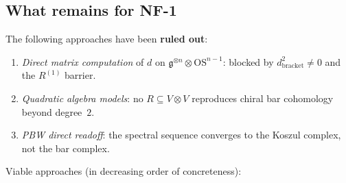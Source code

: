 \documentclass[11pt]{article}
\newcommand{\fg}{\mathfrak{g}}
\begin{document}
\subsection{What remains for NF-1}

The following approaches have been \textbf{ruled out}:

\begin{enumerate}[label=(\alph*)]
\item \emph{Direct matrix computation} of $d$ on
  $\fg^{\otimes n}\otimes\mathrm{OS}^{n-1}$: blocked by
  $d_{\mathrm{bracket}}^2 \neq 0$ and the $R^{(1)}$ barrier.

\item \emph{Quadratic algebra models}: no $R\subseteq V\otimes V$
  reproduces chiral bar cohomology beyond degree~$2$.

\item \emph{PBW direct readoff}: the spectral sequence converges
  to the Koszul complex, not the bar complex.
\end{enumerate}

\noindent Viable approaches (in decreasing order of concreteness):
\end{document}
